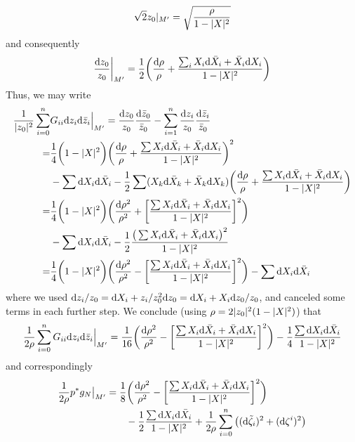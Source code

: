 \begin{equation*}
	\sqrt{2}z_0|_{M'}=\sqrt{\frac{\rho}{1-\lvert X \rvert^2}}
\end{equation*}
and consequently
\begin{equation}
	\frac{\mathrm{d} z_0}{z_0}\bigg|_{M'}=\frac{1}{2}\bigg(\frac{\mathrm{d} \rho}{\rho}
	+\frac{\sum_i X_i\mathrm{d} \bar X_i + \bar X_i \mathrm{d} X_i}{1-\lvert X \rvert^2}\bigg)
\end{equation}
Thus, we may write 
\begin{align*}
	\frac{1}{\lvert z_0 \rvert^2}\sum_{i=0}^n & G_{ii} \mathrm{d} z_i \mathrm{d} \bar z_i \Big|_{M'}
	=\frac{\mathrm{d} z_0}{z_0}\frac{\mathrm{d} \bar z_0}{\bar z_0}-\sum_{i=1}^n \frac{\mathrm{d} z_i}{z_0} \frac{\mathrm{d} \bar z_i}{\bar z_0}\\
	=&\frac{1}{4}\bigg(1-\lvert X \rvert^2\bigg)\bigg(\frac{\mathrm{d} \rho}{\rho}+\frac{\sum X_i \mathrm{d} \bar X_i + \bar X_i \mathrm{d} X_i}{1-\lvert X \rvert^2}\bigg)^2\\
	&-\sum \mathrm{d} X_i \mathrm{d} \bar X_i 
	-\frac{1}{2}\sum(X_k \mathrm{d} \bar X_k+ \bar X_k \mathrm{d} X_k)
	\bigg(\frac{\mathrm{d} \rho}{\rho}+\frac{\sum X_i \mathrm{d} \bar X_i + \bar X_i \mathrm{d} X_i}{1-\lvert X \rvert^2}\bigg)\\
	=&\frac{1}{4}\bigg(1-\lvert X \rvert^2\bigg) \bigg(\frac{\mathrm{d} \rho^2}{\rho^2}
	+\bigg[\frac{\sum X_i \mathrm{d} \bar X_i + \bar X_i \mathrm{d} X_i}{1-\lvert X \rvert^2}\bigg]^2\bigg)\\
	&-\sum \mathrm{d} X_i \mathrm{d} \bar X_i
	-\frac{1}{2}\frac{\big(\sum X_i \mathrm{d} \bar X_i + \bar X_i \mathrm{d} X_i\big)^2}{1-\lvert X \rvert^2}\\
	=&\frac{1}{4}\bigg(1-\lvert X \rvert^2\bigg) \bigg(\frac{\mathrm{d} \rho^2}{\rho^2}
	-\bigg[\frac{\sum X_i \mathrm{d} \bar X_i + \bar X_i \mathrm{d} X_i}{1-\lvert X \rvert^2}\bigg]^2\bigg)
	-\sum \mathrm{d} X_i \mathrm{d} \bar X_i
\end{align*}
where we used $\mathrm{d} z_i/z_0=\mathrm{d} X_i + z_i/z_0^2 \mathrm{d} z_0=\mathrm{d} X_i + X_i \mathrm{d} z_0/z_0$, and canceled some terms in each further step. We conclude (using $\rho=2\lvert z_0 \rvert^2(1-\lvert X \rvert^2)$) that
\begin{equation}
	\frac{1}{2\rho}\sum_{i=0}^n G_{ii} \mathrm{d} z_i \mathrm{d} \bar z_i \Big|_{M'}
	=\frac{1}{16}\bigg(\frac{\mathrm{d} \rho^2}{\rho^2}
	-\bigg[\frac{\sum X_i \mathrm{d} \bar X_i + \bar X_i \mathrm{d} X_i}{1-\lvert X \rvert^2}\bigg]^2\bigg)
	-\frac{1}{4}\frac{\sum \mathrm{d} X_i \mathrm{d} \bar X_i}{1-\lvert X \rvert^2}
\end{equation}
and correspondingly 
\begin{equation}
\begin{aligned}
	\frac{1}{2\rho}p^*g_N\big|_{M'}
	&=\frac{1}{8}\bigg(\frac{\mathrm{d} \rho^2}{\rho^2}
	-\bigg[\frac{\sum X_i \mathrm{d} \bar X_i + \bar X_i \mathrm{d} X_i}{1- \lvert X \rvert^2}\bigg]^2\bigg)\\
	&\qquad -\frac{1}{2}\frac{\sum \mathrm{d} X_i \mathrm{d} \bar X_i}{1- \lvert X \rvert^2}
	+\frac{1}{2\rho}\sum_{i=0}^n \big( (\mathrm{d} \tilde\zeta_i)^2+(\mathrm{d} \zeta^i)^2\big)
\end{aligned}
\end{equation}
